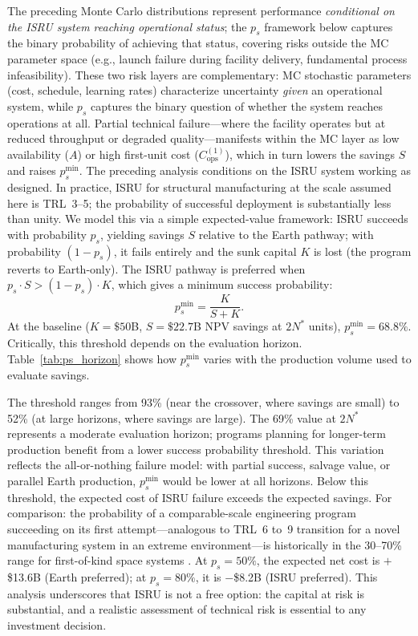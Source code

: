 The preceding Monte Carlo distributions represent performance \emph{conditional on the ISRU system reaching operational status}; the $p_s$ framework below captures the binary probability of achieving that status, covering risks outside the MC parameter space (e.g., launch failure during facility delivery, fundamental process infeasibility). These two risk layers are complementary: MC stochastic parameters (cost, schedule, learning rates) characterize uncertainty \emph{given} an operational system, while $p_s$ captures the binary question of whether the system reaches operations at all. Partial technical failure---where the facility operates but at reduced throughput or degraded quality---manifests within the MC layer as low availability ($A$) or high first-unit cost ($C_{\mathrm{ops}}^{(1)}$), which in turn lowers the savings $S$ and raises $p_s^{\min}$. The preceding analysis conditions on the ISRU system working as designed. In practice, ISRU for structural manufacturing at the scale assumed here is TRL~3--5; the probability of successful deployment is substantially less than unity. We model this via a simple expected-value framework: ISRU succeeds with probability $p_s$, yielding savings $S$ relative to the Earth pathway; with probability $(1 - p_s)$, it fails entirely and the sunk capital $K$ is lost (the program reverts to Earth-only). The ISRU pathway is preferred when $p_s \cdot S > (1 - p_s) \cdot K$, which gives a minimum success probability:
\begin{equation}
  p_s^{\min} = \frac{K}{S + K}.
  \label{eq:p_success}
\end{equation}
At the baseline ($K = \$50$B, $S = \$22.7$B NPV savings at $2N^*$ units), $p_s^{\min} = 68.8\%$. Critically, this threshold depends on the evaluation horizon. Table~\ref{tab:ps_horizon} shows how $p_s^{\min}$ varies with the production volume used to evaluate savings.



The threshold ranges from 93\% (near the crossover, where savings are small) to 52\% (at large horizons, where savings are large). The 69\% value at $2N^*$ represents a moderate evaluation horizon; programs planning for longer-term production benefit from a lower success probability threshold. This variation reflects the all-or-nothing failure model: with partial success, salvage value, or parallel Earth production, $p_s^{\min}$ would be lower at all horizons. Below this threshold, the expected cost of ISRU failure exceeds the expected savings. For comparison: the probability of a comparable-scale engineering program succeeding on its first attempt---analogous to TRL~6 to~9 transition for a novel manufacturing system in an extreme environment---is historically in the 30--70\% range for first-of-kind space systems \cite{wertz2011}. At $p_s = 50\%$, the expected net cost is $+$\$13.6B (Earth preferred); at $p_s = 80\%$, it is $-$\$8.2B (ISRU preferred). This analysis underscores that ISRU is not a free option: the capital at risk is substantial, and a realistic assessment of technical risk is essential to any investment decision.

